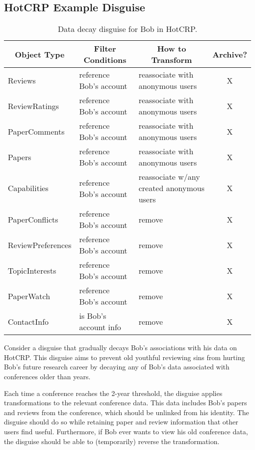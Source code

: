 \subsection{HotCRP Example Disguise}
\begin{table*}[t!]
\begin{tabular}{@{}l|l|l|c@{}}
    \multicolumn{1}{c}{\textbf{Object Type}} & 
    \multicolumn{1}{c}{\textbf{Filter Conditions}} &
    \multicolumn{1}{c}{\textbf{How to Transform}}  &
    \multicolumn{1}{c}{\textbf{Archive?}} \\ 
    \hline
    Reviews & reference Bob's account & reassociate with anonymous users & X\\
    ReviewRatings & reference Bob's account & reassociate with anonymous users & X \\
    PaperComments & reference Bob's account & reassociate with anonymous users & X \\
    Papers 
        & reference Bob's account %
        & reassociate with anonymous users & X\\
    Capabilities & reference Bob's account & reassociate w/any created anonymous users & X \\
    PaperConflicts & reference Bob's account & remove & X \\
    ReviewPreferences & reference Bob's account & remove &  X \\
    TopicInterests & reference Bob's account & remove &  X \\
    PaperWatch & reference Bob's account & remove & X \\
    ContactInfo & is Bob's account info & remove & X \\
\end{tabular}

    \caption{Data decay disguise for Bob in HotCRP.}
    \label{tab:hotcrp}
\end{table*}

Consider a disguise that gradually decays Bob's associations with his data on HotCRP. This disguise
aims to prevent old youthful reviewing sins from hurting Bob's future research career by 
decaying any of Bob's data associated with conferences older than  years.

Each time a conference reaches the 2-year threshold, the disguise applies transformations to the
relevant conference data. This data includes Bob's papers and reviews from the conference, which
should be unlinked from his identity. 
%
The disguise should do so while retaining paper and review information that other users find useful.
%
Furthermore, if Bob ever wants to view his old conference data, the disguise should be able to
(temporarily) reverse the transformation. 

